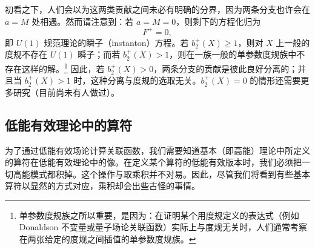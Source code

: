 初看之下，人们会以为这两类贡献之间未必有明确的分界，因为两条分支也许会在 $a=M$ 处相遇。然而请注意到：若 $a=M=0$，则剩下的方程化归为
\[
F^+=0,
\]
即 $U(1)$ 规范理论的瞬子（instanton）方程。若 $b_2^+(X)\ge1$，则对 $X$ 上一般的度规不存在 $U(1)$ 瞬子；而若 $b_2^+(X)>1$，则在一族一般的单参数度规族中不存在这样的解。\footnote{单参数度规族之所以重要，是因为：在证明某个用度规定义的表达式（例如 Donaldson 不变量或量子场论关联函数）实际上与度规无关时，人们通常考察在两张给定的度规之间插值的单参数度规族。} 因此，若 $b_2^+(X)>0$，两条分支的贡献是彼此良好分离的；并且当 $b_2^+(X)>1$ 时，这种分离与度规的选取无关。$b_2^+(X)=0$ 的情形还需要更多研究（目前尚未有人做过）。



\subsection{低能有效理论中的算符}

为了通过低能有效场论计算关联函数，我们需要知道基本（即高能）理论中所定义的算符在低能有效理论中的像。在定义某个算符的低能有效版本时，我们必须把一切高能模式都积掉。这个操作与取乘积并不对易。因此，尽管我们将看到有些基本算符以显然的方式对应，乘积却会出些古怪的事情。

